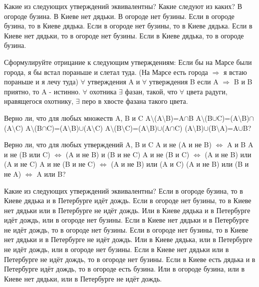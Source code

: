 \documentclass[12pt]{article}
\begin{document}

\z Какие из следующих утверждений эквивалентны? Какие следуют из каких?
	\p В огороде бузина.
	\p В Киеве нет дядьки.
	\p В огороде нет бузины.
	\p Если в огороде бузина, то в Киеве дядька.
	\p Если в огороде нет бузины, то в Киеве дядька.
	\p Если в Киеве нет дядьки, то в огороде нет бузины.
	\p Если в Киеве дядька, то в огороде бузина.

\z Сформулируйте отрицание к следующим утверждениям:
	\p Если бы на Марсе были города, я бы встал пораньше и слетал туда. (На Марсе есть города $\Rightarrow $ я встаю пораньше и я лечу туда)
	 $\forall$ утверждения A и $\forall$ утверждения B если A $\Rightarrow$ B и B приятно, то A - истинно.
	\p $\forall$ охотника $\exists$ фазан, такой, что $\forall$ цвета радуги, нравящегося охотнику, $\exists$ перо в хвосте фазана такого цвета.

\z Верно ли, что для любых множеств A, B и C
	\p A$\setminus$(A$\setminus$B)=A$\cap$B
	\p A$\setminus$(B$\cup$C)=(A$\setminus$B)$\cap$(A$\setminus$C)
	\p A$\setminus$(B$\cap$C)=(A$\setminus$B)$\cup$(A$\setminus$C)
	\p A$\setminus$(B$\setminus$C)=(A$\setminus$B)$\cup$(A$\cap$C)
	\p (A$\setminus$B)$\cup$(B$\setminus$A)=A$\cup$B?

\z Верно ли, что для любых утверждений A, B и C
	\p A и не (A и не B) $\Leftrightarrow$ A и B
	\p A и не (B или C) $\Leftrightarrow$ (A и не B) и (B и не C)
	\p A и не (B и C) $\Leftrightarrow$ (A и не B) или (A и не C)
	\p A и не (B и не C) $\Leftrightarrow$ (A и не B) или (A и C)
	\p (A и не B) или (B и не A) $\Leftrightarrow$ A или B?

\z Какие из следующих утверждений эквивалентны? 
	\p Если в огороде бузина, то в Киеве дядька и в Петербурге идёт дождь.
	\p Если в огороде нет бузины, то в Киеве нет дядьки или в Петербурге не идёт дождь.
	\p Или в Киеве дядька и в Петербурге идёт дождь, или в огороде нет бузины.
	\p Если в Киеве нет дядьки и в Петербурге не идёт дождь, то в огороде нет бузины.
	\p Если в огороде нет бузины, то в Киеве нет дядьки и в Петербурге не идёт дождь.
	\p Или в Киеве дядька, или в Петербурге не идёт дождь, или в огороде нет бузины.
	\p Если в Киеве нет дядьки или в Петербурге не идёт дождь, то в огороде нет бузины.
	\p Если в Киеве есть дядька и в Петербурге идёт дождь, то в огороде есть бузина.
	\p Или в огороде бузина, или в Киеве нет дядьки, или в Петербурге не идёт дождь.
\end{document}
